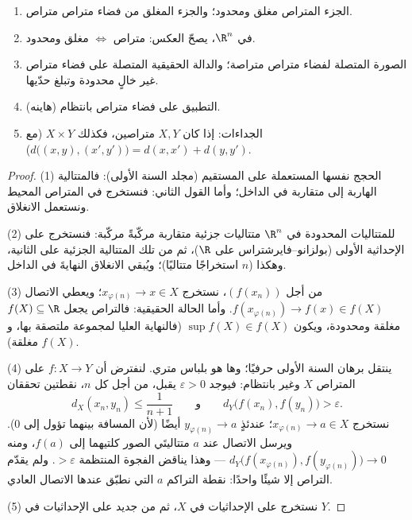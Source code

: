 \begin{theorem}\label{thm:b2:metric:compactprops}
\begin{enumerate}
  \item الجزء المتراص مغلق ومحدود؛ والجزء المغلق من فضاء
        متراص متراص.
  \item في $\R^n$، يصحّ العكس: متراص $\iff$ مغلق
        ومحدود.
  \item الصورة المتصلة لفضاء متراص متراصة؛ والدالة الحقيقية
        المتصلة على فضاء متراص غير خالٍ محدودة وتبلغ
        حدّيها.
  \item (هاينه) التطبيق  على فضاء متراص  بانتظام.
  \item الجداءات: إذا كان $X, Y$ متراصين، فكذلك $X \times Y$ (مع
        $d\bigl((x,y),(x',y')\bigr) = d(x,x') + d(y,y')$).
\end{enumerate}
\end{theorem}

\begin{proof}
(1) الحجج نفسها المستعملة على المستقيم (مجلد السنة الأولى): فالمتتالية
الهاربة إلى %
متقاربة في الداخل؛ وأما القول الثاني: فنستخرج في المتراص
المحيط ونستعمل الانغلاق.

(2) للمتتاليات المحدودة في $\R^n$ متتاليات جزئية متقاربة
مركّبةً مركّبة: فنستخرج على الإحداثية الأولى
(بولزانو--فايرشتراس على $\R$)، ثم من تلك المتتالية الجزئية على
الثانية، وهكذا ($n$ استخراجًا متتاليًا)؛ ويُبقي الانغلاق
النهايةَ في الداخل.

(3) من أجل $(f(x_n))$، نستخرج $x_{\varphi(n)} \to x \in X$؛
ويعطي الاتصال $f(x_{\varphi(n)}) \to f(x) \in f(X)$. وأما الحالة الحقيقية:
فالتراص يجعل $f(X) \subseteq \R$ مغلقة ومحدودة، ويكون
$\sup f(X) \in f(X)$ (فالنهاية العليا لمجموعة ملتصقة بها، و
$f(X)$ مغلقة).

(4) ينتقل برهان السنة الأولى حرفيًا؛ وها هو بلباس متري.
لنفترض أن $f \colon X \to Y$  على المتراص $X$
وغير  بانتظام: فيوجد $\varepsilon > 0$ يقبل، من أجل
كل $n$، نقطتين تحققان
\[
d_X(x_n, y_n) \leq \frac{1}{n+1}
\qquad\text{و}\qquad
d_Y\bigl(f(x_n), f(y_n)\bigr) > \varepsilon .
\]
نستخرج $x_{\varphi(n)} \to a \in X$؛ عندئذٍ $y_{\varphi(n)} \to
a$ أيضًا (لأن المسافة بينهما تؤول إلى $0$). ويرسل الاتصال عند $a$
متتاليتَي الصور كلتيهما إلى $f(a)$، ومنه
$d_Y\bigl(f(x_{\varphi(n)}), f(y_{\varphi(n)})\bigr) \to 0$ ---
وهذا يناقض الفجوة المنتظمة $> \varepsilon$. ولم يقدّم التراص
إلا شيئًا واحدًا: نقطة التراكم $a$ التي نطبّق عندها
الاتصال العادي.

(5) نستخرج على الإحداثيات في $X$، ثم من جديد على
الإحداثيات في $Y$.
\end{proof}

